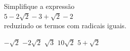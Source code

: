 Simplifique a expressão\\$5-2\sqrt{2}-3+\sqrt{2}-2$\\reduzindo os termos com radicais iguais.

$-\sqrt{2}$
$-2\sqrt{2}$
$\sqrt{3}$
$10\sqrt{2}$
$5+\sqrt{2}$


